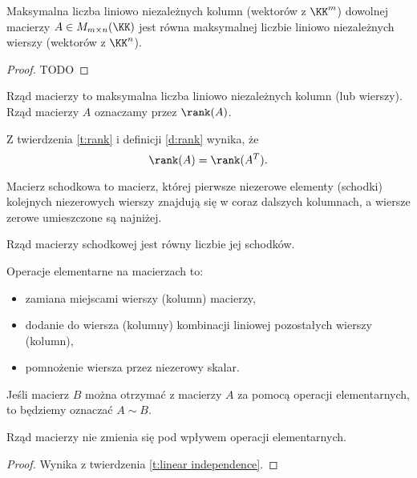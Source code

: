 \begin{theorem}
    \label{t:rank}
    Maksymalna liczba liniowo niezależnych kolumn (wektorów z $\KK^m$) dowolnej macierzy $A \in M_{m\times n}(\KK)$ jest równa maksymalnej liczbie liniowo niezależnych wierszy (wektorów z $\KK^n$).
\end{theorem}
\begin{proof}
    TODO
\end{proof}

\begin{definition}
    \label{d:rank}
    Rząd macierzy to maksymalna liczba liniowo niezależnych kolumn (lub wierszy). Rząd macierzy $A$ oznaczamy przez $\rank (A)$.
\end{definition}

Z twierdzenia \ref{t:rank} i definicji \ref{d:rank} wynika, że
\[ \rank(A) = \rank(A^T). \]

\begin{definition}
    Macierz schodkowa to macierz, której pierwsze niezerowe elementy (schodki) kolejnych niezerowych wierszy znajdują się w coraz dalszych kolumnach, a wiersze zerowe umieszczone są najniżej.
\end{definition}

\begin{fact}
    Rząd macierzy schodkowej jest równy liczbie jej schodków.
\end{fact}

\begin{definition}
    Operacje elementarne na macierzach to:
    \begin{itemize}
        \item zamiana miejscami wierszy (kolumn) macierzy,
        \item dodanie do wiersza (kolumny) kombinacji liniowej pozostałych wierszy (kolumn),
        \item pomnożenie wiersza przez niezerowy skalar.
    \end{itemize}
    Jeśli macierz $B$ można otrzymać z macierzy $A$ za pomocą operacji elementarnych, to będziemy oznaczać $A \sim B$.
\end{definition}

\begin{fact}
    Rząd macierzy nie zmienia się pod wpływem operacji elementarnych.
\end{fact}
\begin{proof}
    Wynika z twierdzenia \ref{t:linear independence}.
\end{proof}

